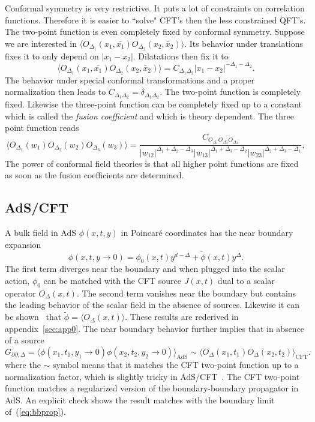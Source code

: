 \documentclass{PoS}
\begin{document}
Conformal symmetry is very restrictive. It puts a lot of constraints on correlation functions. Therefore it is easier to ``solve" CFT's then the less constrained QFT's. The two-point function is even completely fixed by conformal symmetry. Suppose we are interested in $\langle O_{\Delta_1}(x_1,\bar{x_1})O_{\Delta_2}(x_2,\bar{x}_2)\rangle.$ Its behavior under translations fixes it to only depend on $\left| x_{1}-x_2\right|$. Dilatations then fix it to
\begin{equation}
 \langle O_{\Delta_1}(x_1,\bar{x_1})O_{\Delta_2}(x_2,\bar{x}_2)\rangle = C_{\Delta_1\Delta_2}\left| x_{1}-x_2\right|^{-\Delta_1-\Delta_2}.
 \label{eq:CFT2pt}
 \end{equation}
The behavior under special conformal transformations and a proper normalization then leads to $C_{\Delta_1\Delta_2}=\delta_{\Delta_1\Delta_2}$. The two-point function is completely fixed. Likewise the three-point function can be completely fixed up to a constant which is called the \textit{fusion coefficient} and which is theory dependent. The three point function reads
\begin{equation}
\langle O_{\Delta_1}(w_1)O_{\Delta_2}(w_2)O_{\Delta_3}(w_3)\rangle = \frac{C_{O_{\Delta_1}O_{\Delta_2}O_{\Delta_3}}}{\left| w_{12}\right|^{\Delta_1+\Delta_2-\Delta_3}\left| w_{13}\right|^{\Delta_1+\Delta_3-\Delta_2}\left| w_{23}\right|^{\Delta_2+\Delta_3-\Delta_1}},
\label{eq:CFT3pt}
\end{equation} 
The power of conformal field theories is that all higher point functions are fixed as soon as the fusion coefficients are determined. 
\subsection{AdS/CFT}
A bulk field in AdS $\phi(x,t,y)$ in Poincar\'e coordinates has the near boundary expansion~\cite{Aharony:1999ti}
\begin{equation}
 \phi(x,t,y\rightarrow 0) = \phi_0(x,t) y^{d-\Delta} + \tilde{\phi}(x,t) y^\Delta.
 \label{eq:scalexpand}
\end{equation}
The first term diverges near the boundary and when plugged into the scalar action, $\phi_0$ can be matched with the CFT source $J(x,t)$ dual to a scalar operator $O_\Delta (x,t)$. The second term vanishes near the boundary but contains the leading behavior of the scalar field in the absence of sources. Likewise it can be shown~\cite{Witten:1998qj,Balasubramanian:1998sn} that $\tilde{\phi} = \langle O_\Delta(x,t)\rangle$. These results are rederived in appendix~\ref{sec:app0}. The near boundary behavior further implies that in absence of a source 
\begin{equation}
G_{\partial\partial,\Delta} = \langle \phi(x_1,t_1,y_1\rightarrow 0)\phi(x_2,t_2,y_2\rightarrow 0)\rangle_{\text{AdS}} \sim\langle O_\Delta(x_1,t_1)O_\Delta (x_2,t_2)\rangle_{\text{CFT}}.
\end{equation}
where the $\sim$ symbol means that it matches the CFT two-point function up to a normalization factor, which is slightly tricky in AdS/CFT~\cite{Freedman:1998tz}.
The CFT two-point function matches a regularized version of the boundary-boundary propagator in AdS. An explicit check shows the result matches with the boundary limit of~(\ref{eq:bbprop}).
\end{document}
